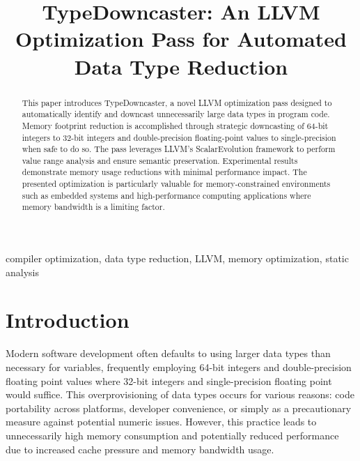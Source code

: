 \documentclass[conference]{IEEEtran}
\begin{document}
\title{TypeDowncaster: An LLVM Optimization Pass for Automated Data Type Reduction}

\author{
}

\maketitle

\begin{abstract}
This paper introduces TypeDowncaster, a novel LLVM optimization pass designed to automatically identify and downcast unnecessarily large data types in program code. Memory footprint reduction is accomplished through strategic downcasting of 64-bit integers to 32-bit integers and double-precision floating-point values to single-precision when safe to do so. The pass leverages LLVM's ScalarEvolution framework to perform value range analysis and ensure semantic preservation. Experimental results demonstrate memory usage reductions with minimal performance impact. The presented optimization is particularly valuable for memory-constrained environments such as embedded systems and high-performance computing applications where memory bandwidth is a limiting factor.
\end{abstract}

\begin{IEEEkeywords}
compiler optimization, data type reduction, LLVM, memory optimization, static analysis
\end{IEEEkeywords}

\section{Introduction}
Modern software development often defaults to using larger data types than necessary for variables, frequently employing 64-bit integers and double-precision floating point values where 32-bit integers and single-precision floating point would suffice. This overprovisioning of data types occurs for various reasons: code portability across platforms, developer convenience, or simply as a precautionary measure against potential numeric issues. However, this practice leads to unnecessarily high memory consumption and potentially reduced performance due to increased cache pressure and memory bandwidth usage.
\end{document}
